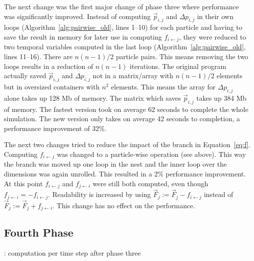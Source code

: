 \documentclass[twoside,11pt]{article}
\begin{document}
The next change was the first major change of phase three where
performance was significantly improved.
Instead of computing $\vec{p}_{i,j}$ and $\Delta p_{i,j}$ in their
own loops (Algorithm~\ref{alg:pairwise_old}, lines 1--10) for each
particle and having to save the result in memory for later use in
computing $f_{i \leftarrow j}$, they were reduced to two temporal
variables computed in the last loop (Algorithm~\ref{alg:pairwise_old},
lines 11--16).
There are $n(n-1)/2$ particle pairs.
This means removing the two loops results in a reduction of $n(n-1)$
iterations.
The original program actually saved $\vec{p}_{i,j}$ and
$\Delta p_{i,j}$ not in a matrix/array with $n(n-1)/2$ elements but
in oversized containers with $n^2$ elements.
This means the array for $\Delta p_{i,j}$ alone takes up 128 Mb
of memory.
The matrix which saves $\vec{p}_{i,j}$ takes up 384 Mb of memory.
The fastest version took on average 62 seconds to complete the whole
simulation.
The new version only takes on average 42 seconds to completion, a
performance improvement of 32\%.

The next two changes tried to reduce the impact of the branch in
Equation~\ref{eq:f}.
Computing $f_{i \leftarrow j}$ was changed to a particle-wise
operation (see above).
This way the branch was moved up one loop in the nest and the inner
loop over the dimensions was again unrolled.
This resulted in a 2\% performance improvement.
At this point $f_{i \leftarrow j}$ and $f_{j \leftarrow i}$ were
still both computed, even though
$f_{j \leftarrow i} = -f_{i \leftarrow j}$.
Readability is increased by using
$\vec{F}_j := \vec{F}_j - f_{i \leftarrow j}$ instead of
$\vec{F}_j := \vec{F}_j + f_{j \leftarrow i}$.
This change has no effect on the performance.


\subsection{Fourth Phase} %

\begin{algorithm} %
  \caption{: computation per time step after phase three}
  \label{alg:new}

  \begin{algorithmic}[1]

      \ENDFOR
    \ENDFOR

    \ENDFOR

  \end{algorithmic}
\end{algorithm} %
\end{document}
